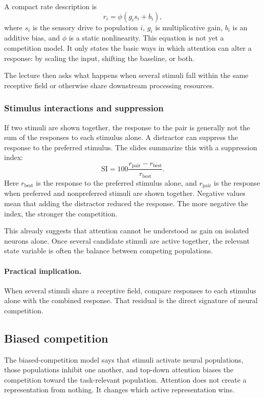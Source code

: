 A compact rate description is
\[
r_i = \phi(g_i s_i + b_i),
\]
where \(s_i\) is the sensory drive to population \(i\), \(g_i\) is multiplicative gain, \(b_i\) is an additive bias, and \(\phi\) is a static nonlinearity. This equation is not yet a competition model. It only states the basic ways in which attention can alter a response: by scaling the input, shifting the baseline, or both.

The lecture then asks what happens when several stimuli fall within the same receptive field or otherwise share downstream processing resources.

\subsubsection{Stimulus interactions and suppression}

If two stimuli are shown together, the response to the pair is generally not the sum of the responses to each stimulus alone. A distractor can suppress the response to the preferred stimulus. The slides summarize this with a suppression index:
\[
\mathrm{SI}
=
100\frac{r_{\mathrm{pair}}-r_{\mathrm{best}}}{r_{\mathrm{best}}}.
\]
Here \(r_{\mathrm{best}}\) is the response to the preferred stimulus alone, and \(r_{\mathrm{pair}}\) is the response when preferred and nonpreferred stimuli are shown together. Negative values mean that adding the distractor reduced the response. The more negative the index, the stronger the competition.

This already suggests that attention cannot be understood as gain on isolated neurons alone. Once several candidate stimuli are active together, the relevant state variable is often the balance between competing populations.

\paragraph{Practical implication.}
When several stimuli share a receptive field, compare responses to each stimulus alone with the combined response. That residual is the direct signature of neural competition.

\subsection{Biased competition}

The biased-competition model says that stimuli activate neural populations, those populations inhibit one another, and top-down attention biases the competition toward the task-relevant population. Attention does not create a representation from nothing. It changes which active representation wins.

